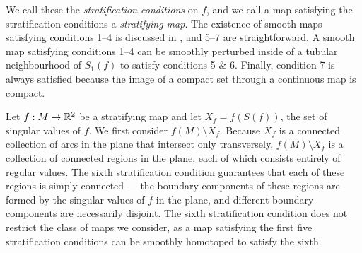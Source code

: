 We call these the \emph{stratification conditions} on $f$, and we call a map satisfying the stratification conditions a \emph{stratifying map}.
The existence of smooth maps satisfying conditions 1--4 is discussed in \cite{Levine65}, and 5--7 are straightforward.
A smooth map satisfying conditions 1--4 can be smoothly perturbed inside of a tubular neighbourhood of $S_1(f)$ to satisfy conditions 5 \& 6.
Finally, condition 7 is always satisfied because the image of a compact set through a continuous map is compact.


Let $f:M\to\mathbb{R}^2$ be a stratifying map and let $X_f = f(S(f))$, the set of singular values of $f$.
We first consider $f(M)\setminus X_f$.
Because $X_f$ is a connected collection of arcs in the plane that intersect only transversely, $f(M)\setminus X_f$ is a collection of connected regions in the plane, each of which consists entirely of regular values.
The sixth stratification condition guarantees that each of these regions is simply connected --- the boundary components of these regions are formed by the singular values of $f$ in the plane, and different boundary components are necessarily disjoint.
The sixth stratification condition does not restrict the class of maps we consider, as a map satisfying the first five stratification conditions can be smoothly homotoped to satisfy the sixth.


